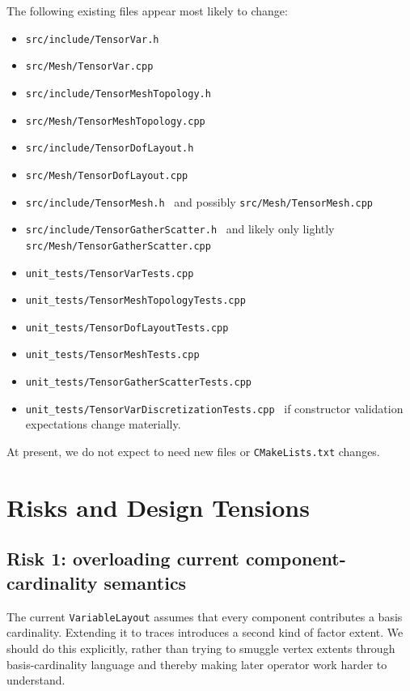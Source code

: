 \documentclass[11pt]{article}
\begin{document}
The following existing files appear most likely to change:
\begin{itemize}[leftmargin=2em]
  \item \texttt{src/include/TensorVar.h}
  \item \texttt{src/Mesh/TensorVar.cpp}
  \item \texttt{src/include/TensorMeshTopology.h}
  \item \texttt{src/Mesh/TensorMeshTopology.cpp}
  \item \texttt{src/include/TensorDofLayout.h}
  \item \texttt{src/Mesh/TensorDofLayout.cpp}
  \item \texttt{src/include/TensorMesh.h} \, and possibly \texttt{src/Mesh/TensorMesh.cpp}
  \item \texttt{src/include/TensorGatherScatter.h} \, and likely only lightly \texttt{src/Mesh/TensorGatherScatter.cpp}
  \item \texttt{unit\_tests/TensorVarTests.cpp}
  \item \texttt{unit\_tests/TensorMeshTopologyTests.cpp}
  \item \texttt{unit\_tests/TensorDofLayoutTests.cpp}
  \item \texttt{unit\_tests/TensorMeshTests.cpp}
  \item \texttt{unit\_tests/TensorGatherScatterTests.cpp}
  \item \texttt{unit\_tests/TensorVarDiscretizationTests.cpp} \, if constructor validation expectations change materially.
\end{itemize}

At present, we do not expect to need new files or \texttt{CMakeLists.txt} changes.

\section{Risks and Design Tensions}

\subsection{Risk 1: overloading current component-cardinality semantics}

The current \texttt{VariableLayout} assumes that every component contributes a basis cardinality. Extending it to traces introduces a second kind of factor extent. We should do this explicitly, rather than trying to smuggle vertex extents through basis-cardinality language and thereby making later operator work harder to understand.
\end{document}
